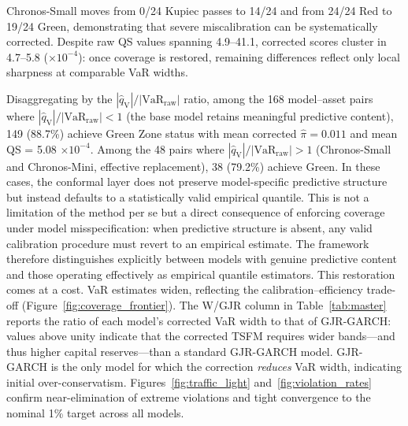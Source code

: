 \documentclass[preprint,11pt,authoryear]{elsarticle}
\newcommand{\VaR}{\mathrm{VaR}}
\newcommand{\1}{\boldsymbol{1}}
\newcommand{\qV}{\hat{q}_{\scriptscriptstyle\mathrm{V}}}
\begin{document}
	Chronos-Small moves from 0/24 Kupiec passes to 14/24 and from
	24/24 Red to 19/24 Green, demonstrating that severe
	miscalibration can be systematically corrected. Despite raw QS
	values spanning 4.9--41.1, corrected scores cluster in
	4.7--5.8 ($\times 10^{-4}$): once coverage is restored,
	remaining differences reflect only local sharpness at
	comparable VaR widths.
	
	Disaggregating by the $|\qV|/|\VaR_{\mathrm{raw}}|$
	ratio, among the 168 model--asset pairs where
	$|\qV|/|\VaR_{\mathrm{raw}}| < 1$ (the base model retains
	meaningful predictive content), 149 (88.7\%) achieve Green Zone
	status with mean corrected $\hat\pi = 0.011$ and mean
	QS = 5.08 $\times 10^{-4}$. Among the 48 pairs where
	$|\qV|/|\VaR_{\mathrm{raw}}| > 1$ (Chronos-Small and
	Chronos-Mini, effective replacement), 38 (79.2\%) achieve Green.
	In these cases, the conformal layer does not preserve model-specific predictive structure but instead defaults to a statistically valid empirical quantile. This is not a limitation of the method per se but a direct consequence of enforcing coverage under model misspecification: when predictive structure is absent, any valid calibration procedure must revert to an empirical estimate.
	The framework therefore distinguishes explicitly between models with genuine predictive content and those operating effectively as empirical quantile estimators.
	This restoration comes at a cost. VaR estimates widen, reflecting
	the calibration--efficiency trade-off
	(Figure~\ref{fig:coverage_frontier}). The W/GJR column in
	Table~\ref{tab:master} reports the ratio of each model's
	corrected VaR width to that of GJR-GARCH: values above unity
	indicate that the corrected TSFM requires wider bands---and
	thus higher capital reserves---than a standard GJR-GARCH model.
	GJR-GARCH is the only model for which the correction
	\emph{reduces} VaR width, indicating initial over-conservatism.
	Figures~\ref{fig:traffic_light} and~\ref{fig:violation_rates}
	confirm near-elimination of extreme violations and tight
	convergence to the nominal 1\% target across all models.
	
\end{document}
